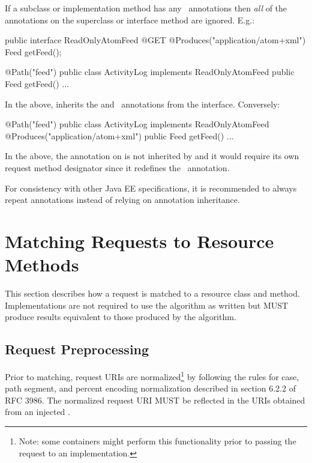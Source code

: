 If a subclass or implementation method has any \jaxrs\ annotations then {\em all} of the annotations on the superclass or interface method are ignored. E.g.:

\begin{listing}{1}
public interface ReadOnlyAtomFeed {
  @GET @Produces("application/atom+xml")
  Feed getFeed();
}

@Path("feed")
public class ActivityLog implements ReadOnlyAtomFeed {
  public Feed getFeed() {...}
}
\end{listing}

In the above,  inherits the  and \Produces\ annotations from the interface. Conversely:

\begin{listing}{1}
@Path("feed")
public class ActivityLog implements ReadOnlyAtomFeed {
  @Produces("application/atom+xml")
  public Feed getFeed() {...}
}
\end{listing}

In the above, the  annotation on  is not inherited by  and it would require its own request method designator since it redefines the \Produces\ annotation.

For consistency with other Java EE specifications, it is recommended to always repeat annotations instead of relying on annotation inheritance. 

\section{Matching Requests to Resource Methods}
\label{mapping_requests_to_java_methods}

This section describes how a request is matched to a resource class and method. Implementations are not required to use the algorithm as written but MUST produce results equivalent to those produced by the algorithm.

\subsection{Request Preprocessing}
\label{reqpreproc}

Prior to matching, request URIs are normalized\footnote{Note: some containers might perform this functionality prior to passing the request to an implementation.} by following the rules for case, path segment, and percent encoding normalization described in section 6.2.2 of RFC 3986\cite{uri}. The normalized request URI MUST be reflected in the URIs obtained from an injected .

